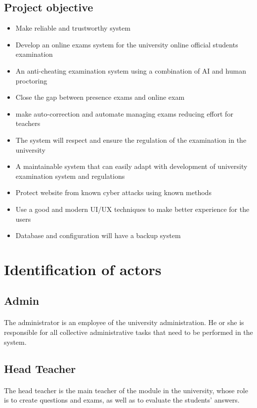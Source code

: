 \documentclass[]{uc2pfecaneva}
\begin{document}
\subsection{Project objective}
\begin{itemize}
	\item Make reliable and trustworthy system
	\item Develop an online exams system for the university online official students examination
	\item An anti-cheating examination system using a combination of AI and human proctoring
	\item Close the gap between presence exams and online exam
	\item make auto-correction and automate managing exams reducing effort for teachers
	\item The system will respect and ensure the regulation of the examination in the university
	\item A maintainable system that can easily adapt  with development of university examination system and regulations
	\item Protect website from known cyber attacks using known methods
	\item Use a good and modern UI/UX techniques to make better experience for the users
	\item Database and configuration will have a backup system
\end{itemize}


\section{Identification of actors}
\subsection{Admin}
\justifying\paragraph{}
	The administrator is an employee of the university administration. He or she is responsible for all collective administrative tasks that need to be performed in the system.

\subsection{Head Teacher}
\justifying\paragraph{}
	The head teacher is the main teacher of the module in the university, whose role is to create questions and exams, as well as to evaluate the students' answers.
\end{document}
